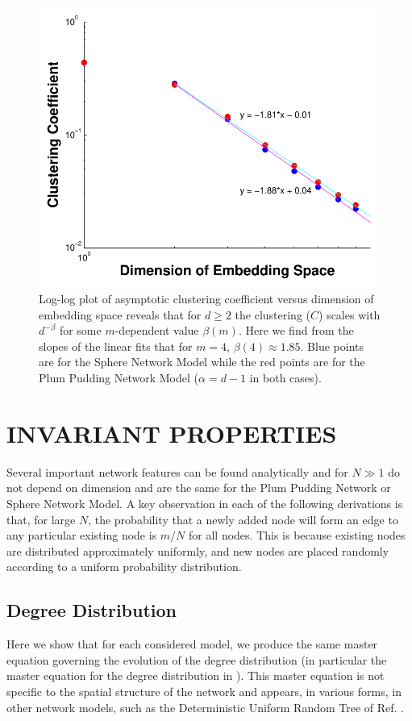 \documentclass[aps,pre,manuscript,superscriptaddress,amsmath,amssymb,nofootinbib]{revtex4-1}
\begin{document}
\begin{figure}
\includegraphics[width=\linewidth]{figures/figCvsD.pdf}
\caption{\label{clustdim}Log-log plot of asymptotic clustering coefficient versus dimension of embedding space reveals that for $d \geq 2$ the clustering ($C$) scales with $d^{-\beta}$ for some $m$-dependent value $\beta(m)$. Here we find from the slopes of the linear fits that for $m=4$, $\beta(4) \approx 1.85$. Blue points are for the Sphere Network Model while the red points are for the Plum Pudding Network Model ($\alpha = d-1$ in both cases).}
\end{figure}

\section{INVARIANT PROPERTIES}
Several important network features can be found analytically and for $N \gg 1$ do not depend on dimension and are the same for the Plum Pudding Network or Sphere Network Model.
A key observation in each of the following derivations is that, for large $N$, the probability that a newly added node will form an edge to any particular existing node is $m/N$ for all nodes.
This is because existing nodes are distributed approximately uniformly, and new nodes are placed randomly according to a uniform probability distribution.

\subsection{Degree Distribution}
\label{sub:degreedistribution}
Here we show that for each considered model, we produce the same master equation governing the evolution of the degree distribution (in particular the master equation for the degree distribution in \cite{ozik2004}).  
This master equation is not specific to the spatial structure of the network and appears, in various forms, in other network models, such as the Deterministic Uniform Random Tree of Ref. \cite{zhang2008topologies}.
\end{document}

